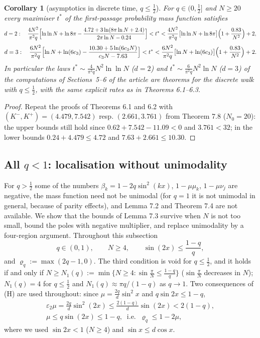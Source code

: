 \documentclass[11pt,a4paper]{article}
\newtheorem{corollary}[theorem]{Corollary}
\theoremstyle{definition}
\theoremstyle{remark}
\begin{document}
\begin{corollary}[{asymptotics in discrete time, $q\le\frac12$}]
For $q\in(0,\frac12]$ and $N\ge20$ every maximiser $t^*$ of the first-passage probability mass function satisfies
\begin{equation*}
d=2:\quad \frac{4N^2}{\pi^2q}\Bigl[\ln\ln N+\ln8\pi-\frac{4.72+3\ln(8\pi\ln N+2.4)}{2\pi\ln N-0.24}\Bigr]<t^*<\frac{4N^2}{\pi^2q}\bigl[\ln\ln N+\ln8\pi\bigr]\Bigl(1+\frac{0.83}{N^2}\Bigr)+2,
\end{equation*}
\begin{equation*}
d=3:\quad \frac{6N^2}{\pi^2q}\Bigl[\ln N+\ln(6c_3)-\frac{10.30+5\ln(6c_3N)}{c_3N-7.63}\Bigr]<t^*<\frac{6N^2}{\pi^2q}\bigl[\ln N+\ln(6c_3)\bigr]\Bigl(1+\frac{0.83}{N^2}\Bigr)+2 .
\end{equation*}
In particular the laws $t^*\sim\frac{4}{\pi^2q}N^2\ln\ln N$ ($d=2$) and $t^*\sim\frac{6}{\pi^2q}N^2\ln N$ ($d=3$) of the computations of Sections~5--6 of the article are theorems for the discrete walk with $q\le\frac12$, with the same explicit rates as in Theorems 6.1–6.3.
\end{corollary}

\begin{proof}
Repeat the proofs of Theorems 6.1 and 6.2 with $(K^-,K^+)=(4.479,7.542)$ resp. $(2.661,3.761)$ from Theorem 7.8 ($N_0=20$): the upper bounds still hold since $0.62+7.542-11.09<0$ and $3.761<32$; in the lower bounds $0.24+4.479\le4.72$ and $7.63+2.661\le10.30$.
\end{proof}

\subsection{All $q<1$: localisation without unimodality}

For $q>\frac12$ some of the numbers $\beta_k=1-2q\sin^2(kx)$, $1-\mu\mu_k$, $1-\mu\nu_j$ are negative, the mass function need not be unimodal (for $q=1$ it is not unimodal in general, because of parity effects), and Lemma 7.2 and Theorem 7.4 are not available. We show that the bounds of Lemma 7.3 survive when $N$ is not too small, bound the poles with negative multiplier, and replace unimodality by a four-region argument. Throughout this subsection
\begin{equation*}
q\in(0,1),\qquad N\ge4,\qquad \sin(2x)\le\frac{1-q}{q}, \tag{H}
\end{equation*}
and $\varrho_q:=\max(2q-1,0)$. The third condition is void for $q\le\frac12$, and it holds if and only if $N\ge N_1(q):=\min\{N\ge4:\sin\frac\pi N\le\frac{1-q}{q}\}$ ($\sin\frac\pi N$ decreases in $N$); $N_1(q)=4$ for $q\le\frac12$ and $N_1(q)\approx\pi q/(1-q)$ as $q\to1$. Two consequences of (H) are used throughout: since $\mu=\frac{2q}{d}\sin^2x$ and $q\sin2x\le1-q$,
\begin{gather*}
\varepsilon_2\mu=\frac{2q}{d}\sin^2(2x)\le\frac{2(1-q)}{d}\sin(2x)<2(1-q), \\
\mu\le q\sin(2x)\le1-q,\ \text{ i.e. }\ \varrho_q\le1-2\mu, \tag{H'}
\end{gather*}
where we used $\sin2x<1$ ($N\ge4$) and $\sin x\le d\cos x$.
\end{document}
